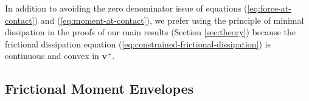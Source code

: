 \documentclass[conference]{IEEEtran}
\newtheorem{proposition}{Proposition}
\begin{document}
In addition to avoiding the zero denominator issue of equations
(\ref{eq:force-at-contact}) and (\ref{eq:moment-at-contact}), we
prefer using the principle of minimal dissipation in the proofs of our
main results (Section \ref{sec:theory}) because the frictional
dissipation equation (\ref{eq:constrained-frictional-dissipation}) is
continuous and convex in $\mathbf{v}^+$.



\subsection{Frictional Moment Envelopes}\label{sec:frictional-envelope}
\end{document}
